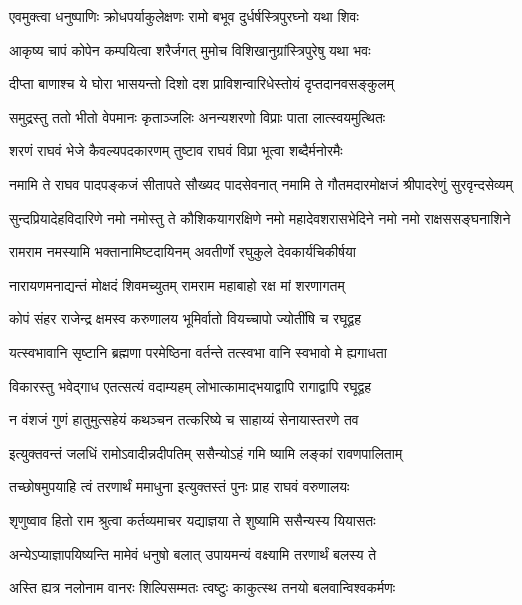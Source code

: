 \twolineshloka
{एवमुक्त्वा धनुष्पाणिः क्रोधपर्याकुलेक्षणः}
{रामो बभूव दुर्धर्षस्त्रिपुरघ्नो यथा शिवः}%

\twolineshloka
{आकृष्य चापं कोपेन कम्पयित्वा शरैर्जगत्}
{मुमोच विशिखानुग्रांस्त्रिपुरेषु यथा भवः}%

\twolineshloka
{दीप्ता बाणाश्च ये घोरा भासयन्तो दिशो दश}
{प्राविशन्वारिधेस्तोयं दृप्तदानवसङ्कुलम्}%

\twolineshloka
{समुद्रस्तु ततो भीतो वेपमानः कृताञ्जलिः}
{अनन्यशरणो विप्राः पाता लात्स्वयमुत्थितः}%

\twolineshloka
{शरणं राघवं भेजे कैवल्यपदकारणम्}
{तुष्टाव राघवं विप्रा भूत्वा शब्दैर्मनोरमैः}%


\twolineshloka
{नमामि ते राघव पादपङ्कजं सीतापते सौख्यद पादसेवनात्}
{नमामि ते गौतमदारमोक्षजं श्रीपादरेणुं सुरवृन्दसेव्यम्}%

\twolineshloka
{सुन्दप्रियादेहविदारिणे नमो नमोस्तु ते कौशिकयागरक्षिणे}
{नमो महादेवशरासभेदिने नमो नमो राक्षससङ्घनाशिने}%

\twolineshloka
{रामराम नमस्यामि भक्तानामिष्टदायिनम्}
{अवतीर्णो रघुकुले देवकार्यचिकीर्षया}%

\twolineshloka
{नारायणमनाद्यन्तं मोक्षदं शिवमच्युतम्}
{रामराम महाबाहो रक्ष मां शरणागतम्}%

\twolineshloka
{कोपं संहर राजेन्द्र क्षमस्व करुणालय}
{भूमिर्वातो वियच्चापो ज्योतींषि च रघूद्वह}%

\twolineshloka
{यत्स्वभावानि सृष्टानि ब्रह्मणा परमेष्ठिना}
{वर्तन्ते तत्स्वभा वानि स्वभावो मे ह्यगाधता}%

\twolineshloka
{विकारस्तु भवेद्गाध एतत्सत्यं वदाम्यहम्}
{लोभात्कामाद्भयाद्वापि रागाद्वापि रघूद्वह}%

\twolineshloka
{न वंशजं गुणं हातुमुत्सहेयं कथञ्चन}
{तत्करिष्ये च साहाय्यं सेनायास्तरणे तव}%

\twolineshloka
{इत्युक्तवन्तं जलधिं रामोऽवादीन्नदीपतिम्}
{ससैन्योऽहं गमि ष्यामि लङ्कां रावणपालिताम्}%

\twolineshloka
{तच्छोषमुपयाहि त्वं तरणार्थं ममाधुना}
{इत्युक्तस्तं पुनः प्राह राघवं वरुणालयः}%

\twolineshloka
{शृणुष्वाव हितो राम श्रुत्वा कर्तव्यमाचर}
{यद्याज्ञया ते शुष्यामि ससैन्यस्य यियासतः}%

\twolineshloka
{अन्येऽप्याज्ञापयिष्यन्ति मामेवं धनुषो बलात्}
{उपायमन्यं वक्ष्यामि तरणार्थं बलस्य ते}%

\twolineshloka
{अस्ति ह्यत्र नलोनाम वानरः शिल्पिसम्मतः}
{त्वष्टुः काकुत्स्थ तनयो बलवान्विश्वकर्मणः}%

